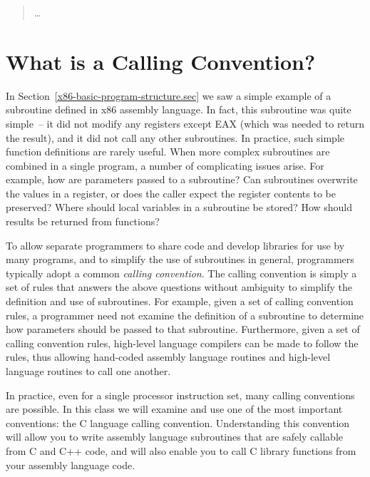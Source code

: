 \begin{quotation}
\ldots
\end{quotation}


\section{What is a Calling Convention?}

In Section~\ref{x86-basic-program-structure.sec} we saw a simple
example of a subroutine defined in x86 assembly language. In fact,
this subroutine was quite simple~-- it did not modify any registers
except EAX (which was needed to return the result), and it did not
call any other subroutines. In practice, such simple function
definitions are rarely useful. When more complex subroutines are
combined in a single program, a number of complicating issues arise.
For example, how are parameters passed to a subroutine? Can
subroutines overwrite the values in a register, or does the caller
expect the register contents to be preserved? Where should local
variables in a subroutine be stored? How should results be returned
from functions?

To allow separate programmers to share code and develop libraries for
use by many programs, and to simplify the use of subroutines in
general, programmers typically adopt a common {\em calling
  convention}. The calling convention is simply a set of rules that
answers the above questions without ambiguity to simplify the
definition and use of subroutines. For example, given a set of calling
convention rules, a programmer need not examine the definition of a
subroutine to determine how parameters should be passed to that
subroutine. Furthermore, given a set of calling convention rules,
high-level language compilers can be made to follow the rules, thus
allowing hand-coded assembly language routines and high-level language
routines to call one another.

In practice, even for a single processor instruction set, many calling
conventions are possible.  In this class we will examine and use one
of the most important conventions: the C language calling convention.
Understanding this convention will allow you to write assembly
language subroutines that are safely callable from C and C++ code, and
will also enable you to call C library functions from your assembly
language code.

